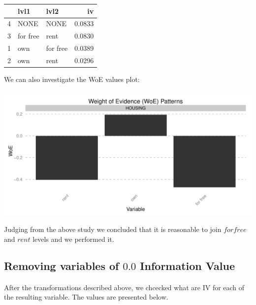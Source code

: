 \documentclass[10pt]{article}\usepackage[]{graphicx}\usepackage[]{color}
\newenvironment{knitrout}{}{} %
\begin{document}
\begin{enumerate}
\begin{knitrout}
\color{fgcolor}
\begin{tabular}{l|l|l|r}
\hline
  & lvl1 & lvl2 & iv\\
\hline
4 & NONE & NONE & 0.0833\\
\hline
3 & for free & rent & 0.0830\\
\hline
1 & own & for free & 0.0389\\
\hline
2 & own & rent & 0.0296\\
\hline
\end{tabular}


\end{knitrout}

We can also investigate the WoE values plot: 

\begin{knitrout}
\color{fgcolor}
\includegraphics[width=.65\linewidth]{figure/unnamed-chunk-15-1} 

\end{knitrout}

Judging from the above study we concluded that it is reasonable to join $for free$ and $rent$ levels and we performed it. 
\end{enumerate}


\subsection{Removing variables of $0.0$ Information Value}
\paragraph{}
After the transformations described above, we chcecked what are IV for each of the resulting variable. The values are presented below.
\end{document}
